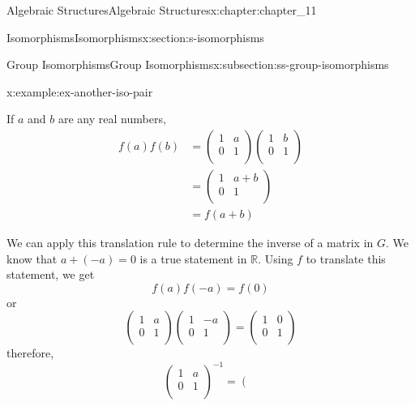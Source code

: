 \documentclass[twoside,10pt,]{book}
\numberwithin{equation}{section}
\begin{document}
\begin{chapterptx}{Algebraic Structures}{}{Algebraic Structures}{}{}{x:chapter:chapter_11}
\begin{sectionptx}{Isomorphisms}{}{Isomorphisms}{}{}{x:section:s-isomorphisms}
\begin{subsectionptx}{Group Isomorphisms}{}{Group Isomorphisms}{}{}{x:subsection:ss-group-isomorphisms}
\begin{example}{}{x:example:ex-another-iso-pair}
\par
If \(a\) and \(b\) are any real numbers,%
\begin{equation*}
\begin{split}
f(a) f(b) & = \left(
\begin{array}{cc}
1 & a \\
0 & 1 \\
\end{array}
\right)\left(
\begin{array}{cc}
1 & b \\
0 & 1 \\
\end{array}
\right)\\
& = \left(
\begin{array}{cc}
1 & a + b \\
0 & 1 \\
\end{array}
\right)\\
& = f(a + b)
\end{split}
\end{equation*}
%
\par
We can apply this translation rule to determine the inverse of a matrix in \(G\). We know that \(a + (-a)=0\) is a true statement in \(\mathbb{R}\). Using \(f\) to translate this statement, we get%
\begin{equation*}
f(a) f(-a) = f(0)
\end{equation*}
or%
\begin{equation*}
\left(
\begin{array}{cc}
1 & a \\
0 & 1 \\
\end{array}
\right)\left(
\begin{array}{cc}
1 & -a \\
0 & 1 \\
\end{array}
\right)=\left(
\begin{array}{cc}
1 & 0 \\
0 & 1 \\
\end{array}
\right)
\end{equation*}
therefore,%
\begin{equation*}
\left(
\begin{array}{cc}
1 & a \\
0 & 1 \\
\end{array}
\right)^{-1}= \left(
\begin{array}{cc}

\end{array}
\end{equation*}
\end{example}
\end{subsectionptx}
\end{sectionptx}
\end{chapterptx}
\end{document}
